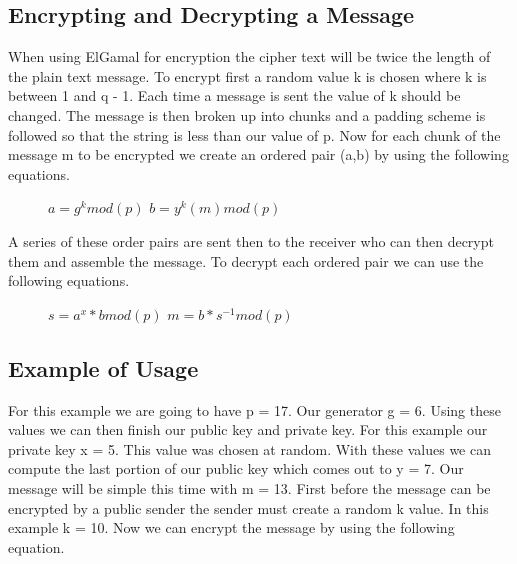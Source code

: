 \documentclass[conference]{IEEEtran}
\begin{document}
\subsection{Encrypting and Decrypting a Message}

When using ElGamal for encryption the cipher text will be twice the length of the plain text message.
To encrypt first a random value k is chosen where k is between 1 and q - 1. Each time a message is sent the value of k should be changed. The message is then broken up into chunks and a padding scheme is followed so that the string is less than our value of p. Now for each chunk of the message m to be encrypted we create an ordered pair (a,b) by using the following equations.

\begin{figure}[h]
	\begin{center}
		$a={g}^{k}mod\left(p\right)$ \newline
		$b={y}^{k}\left(m\right)mod\left(p\right)$ \newline
	\end{center}
\end{figure}

A series of these order pairs are sent then to the receiver who can then decrypt them and assemble the message. To decrypt each ordered pair we can use the following equations.

\begin{figure}[H]
	\begin{center}
		$s={a}^{x} * b mod\left(p\right)$ \newline
		$m=b * {s}^{-1} mod\left(p\right)$ \newline
	\end{center}
\end{figure}


\subsection{Example of Usage}
For this example we are going to have p = 17. Our generator g = 6. Using these values we can then finish our public key and private key. For this example our private key x = 5. This value was chosen at random. With these values we can compute the last portion of our public key which comes out to y = 7. Our message will be simple this time with m = 13. First before the message can be encrypted by a public sender the sender must create a random k value. In this example k = 10. Now we can encrypt the message by using the following equation. \newline
\end{document}
